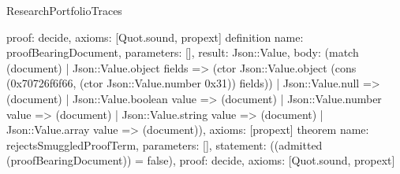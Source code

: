 \begin{lexlean}{ResearchPortfolioTraces}
\begin{semanticmodule}
{ proof: decide{},
 axioms: [Quot.sound, propext]
}
definition{
 name: proofBearingDocument,
 parameters: [],
 result: Json::Value,
 body: (match (document) | Json::Value.object fields => (ctor Json::Value.object (cons (0x70726f6f66, (ctor Json::Value.number 0x31)) fields)) | Json::Value.null => (document) | Json::Value.boolean value => (document) | Json::Value.number value => (document) | Json::Value.string value => (document) | Json::Value.array value => (document)),
 axioms: [propext]
}
theorem{
 name: rejectsSmuggledProofTerm,
 parameters: [],
 statement: ((admitted (proofBearingDocument)) = false),
 proof: decide{},
 axioms: [Quot.sound, propext]
}
\end{semanticmodule}
\end{lexlean}
